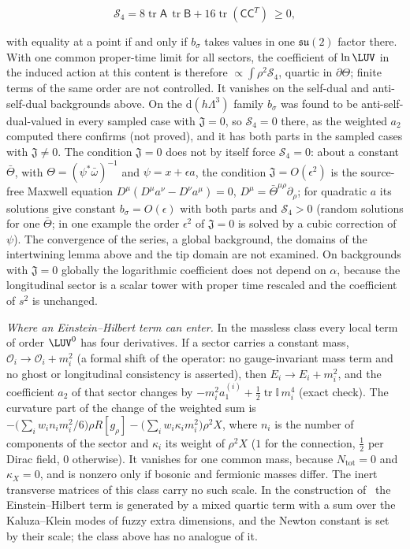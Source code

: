 \[

  \mathcal S_4=8\operatorname{tr}\mathsf A\,\operatorname{tr}\mathsf B+16\operatorname{tr}(\mathsf C\mathsf C^T)\ \ge0,

\]

with equality at a point if and only if \(b_\sigma\) takes values in one \(\mathfrak{su}(2)\) factor there. With one common proper-time limit for all sectors, the coefficient of \(\ln\LUV\) in the induced action at this content is therefore \(\propto\int\rho^2\mathcal S_4\), quartic in \(\partial\Theta\); finite terms of the same order are not controlled. It vanishes on the self-dual and anti-self-dual backgrounds above. On the \(\mathrm d(h\Lambda^3)\) family \(b_\sigma\) was found to be anti-self-dual-valued in every sampled case with \(\mathfrak J=0\), so \(\mathcal S_4=0\) there, as the weighted \(a_2\) computed there confirms (not proved), and it has both parts in the sampled cases with \(\mathfrak J\ne0\). The condition \(\mathfrak J=0\) does not by itself force \(\mathcal S_4=0\): about a constant \(\bar\Theta\), with \(\Theta=(\psi^*\bar\omega)^{-1}\) and \(\psi=x+\epsilon a\), the condition \(\mathfrak J=O(\epsilon^2)\) is the source-free Maxwell equation \(D^\mu(D^\mu a^\nu-D^\nu a^\mu)=0\), \(D^\mu=\bar\Theta^{\mu\rho}\partial_\rho\); for quadratic \(a\) its solutions give constant \(b_\sigma=O(\epsilon)\) with both parts and \(\mathcal S_4>0\) (random solutions for one \(\bar\Theta\); in one example the order \(\epsilon^2\) of \(\mathfrak J=0\) is solved by a cubic correction of \(\psi\)). The convergence of the series, a global background, the domains of the intertwining lemma above and the tip domain are not examined. On backgrounds with \(\mathfrak J=0\) globally the logarithmic coefficient does not depend on \(\alpha\), because the longitudinal sector is a scalar tower with proper time rescaled and the coefficient of \(s^2\) is unchanged.



\emph{Where an Einstein--Hilbert term can enter.} In the massless class every local term of order \(\LUV^0\) has four derivatives. If a sector carries a constant mass, \(\mathcal O_i\to\mathcal O_i+m_i^2\) (a formal shift of the operator: no gauge-invariant mass term and no ghost or longitudinal consistency is asserted), then \(E_i\to E_i+m_i^2\), and the coefficient \(a_2\) of that sector changes by \(-m_i^2a_1^{(i)}+\tfrac12\operatorname{tr}\mathbb I\,m_i^4\) (exact check). The curvature part of the change of the weighted sum is \(-\bigl(\sum_iw_in_im_i^2/6\bigr)\rho R[g_\rho]-\bigl(\sum_iw_i\kappa_im_i^2\bigr)\rho^2X\), where \(n_i\) is the number of components of the sector and \(\kappa_i\) its weight of \(\rho^2X\) (\(1\) for the connection, \(\tfrac12\) per Dirac field, \(0\) otherwise). It vanishes for one common mass, because \(N_{\mathrm{tot}}=0\) and \(\kappa_X=0\), and is nonzero only if bosonic and fermionic masses differ. The inert transverse matrices of this class carry no such scale. In the construction of~\cite{Steinacker2023} the Einstein--Hilbert term is generated by a mixed quartic term with a sum over the Kaluza--Klein modes of fuzzy extra dimensions, and the Newton constant is set by their scale; the class above has no analogue of it.



